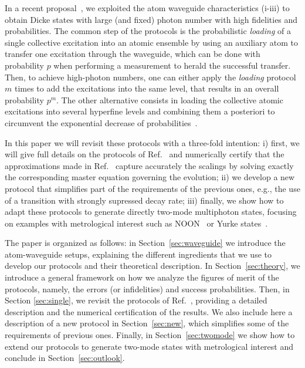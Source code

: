 \documentclass[twocolumn,pra,aps,superscriptaddress,showpacs]{revtex4-1}
\begin{document}
In a recent proposal~\cite{gonzaleztudela17a}, we exploited the atom waveguide characteristics (i-iii) to obtain Dicke states with large (and fixed) photon number with high fidelities and probabilities. The common step of the protocols is the probabilistic \emph{loading} of a single collective excitation into an atomic ensemble by using an auxiliary atom to transfer one excitation through the waveguide, which can be done with probability $p$ when performing a measurement to herald the successful transfer. Then, to achieve high-photon numbers, one can either apply the \emph{loading} protocol $m$ times to add the excitations into the same level, that results in an overall probability $p^m$. The other alternative consists in loading the collective atomic excitations into several hyperfine levels and combining them a posteriori to circumvent the exponential decrease of probabilities~\cite{fiurasek05a}. 

In this paper we will revisit these protocols with a three-fold intention:
i) first, we will give full details on the protocols of Ref.~\cite{gonzaleztudela17a} and numerically certify that the approximations made in Ref.~\cite{gonzaleztudela17a} capture accurately the scalings by solving exactly the corresponding master equation governing the evolution;
ii) we develop a new protocol that simplifies part of the requirements of the previous ones, e.g., the use of a transition with strongly supressed decay rate;
iii) finally, we show how to adapt these protocols to generate directly two-mode multiphoton states, focusing on examples with metrological interest such as NOON~\cite{giovannetti04a} or Yurke states~\cite{yurke86}.

The paper is organized as follows: in Section~\ref{sec:waveguide} we introduce the atom-waveguide setups, explaining the different ingredients that we use to develop our protocols and their theoretical description. In Section~\ref{sec:theory}, we introduce a general framework on how we analyze the figures of merit of the protocols, namely, the errors (or infidelities) and success probabilities. Then, in Section \ref{sec:single}, we revisit the protocols of Ref.~\cite{gonzaleztudela17a}, providing a detailed description and the numerical certification of the results. We also include here a description of a new protocol in Section~\ref{sec:new}, which simplifies some of the requirements of previous ones. Finally, in Section~\ref{sec:twomode} we show how to extend our protocols to generate two-mode states with metrological interest and conclude in Section~\ref{sec:outlook}.
\end{document}
